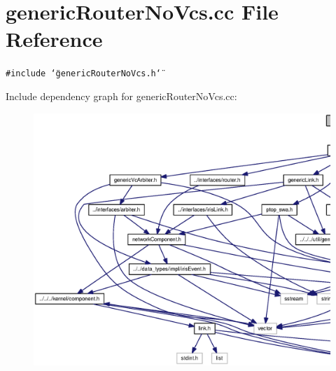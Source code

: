 \section{genericRouterNoVcs.cc File Reference}
\label{genericRouterNoVcs_8cc}
{\tt \#include \char`\"{}genericRouterNoVcs.h\char`\"{}}\par


Include dependency graph for genericRouterNoVcs.cc:\nopagebreak
\begin{figure}[H]
\begin{center}
\leavevmode
\includegraphics[width=420pt]{genericRouterNoVcs_8cc__incl}
\end{center}
\end{figure}

